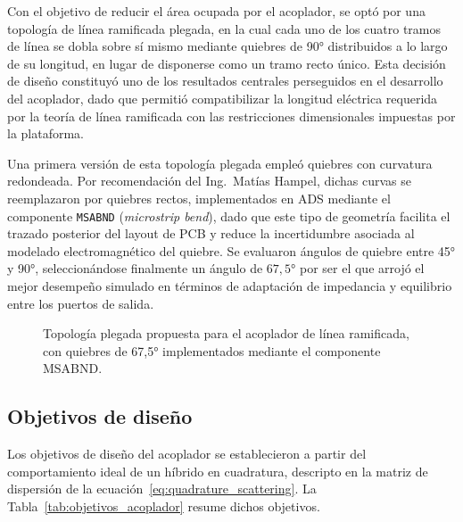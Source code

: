 Con el objetivo de reducir el área ocupada por el acoplador, se optó por una topología de línea ramificada plegada, en la cual cada uno de los cuatro tramos de línea se dobla sobre sí mismo mediante quiebres de 90° distribuidos a lo largo de su longitud, en lugar de disponerse como un tramo recto único. Esta decisión de diseño constituyó uno de los resultados centrales perseguidos en el desarrollo del acoplador, dado que permitió compatibilizar la longitud eléctrica requerida por la teoría de línea ramificada con las restricciones dimensionales impuestas por la plataforma.

Una primera versión de esta topología plegada empleó quiebres con curvatura redondeada. Por recomendación del Ing.~Matías Hampel, dichas curvas se reemplazaron por quiebres rectos, implementados en ADS mediante el componente \texttt{MSABND} (\textit{microstrip bend}), dado que este tipo de geometría facilita el trazado posterior del layout de PCB y reduce la incertidumbre asociada al modelado electromagnético del quiebre. Se evaluaron ángulos de quiebre entre 45° y 90°, seleccionándose finalmente un ángulo de $67{,}5$° por ser el que arrojó el mejor desempeño simulado en términos de adaptación de impedancia y equilibrio entre los puertos de salida.

\begin{figure}[H]
    \centering
    \caption{Topología plegada propuesta para el acoplador de línea ramificada, con quiebres de 67,5° implementados mediante el componente MSABND.}
    \label{fig:acoplador_topologia_plegada}
\end{figure}

\subsection{Objetivos de diseño}
Los objetivos de diseño del acoplador se establecieron a partir del comportamiento ideal de un híbrido en cuadratura, descripto en la matriz de dispersión de la ecuación~\eqref{eq:quadrature_scattering}. La Tabla~\ref{tab:objetivos_acoplador} resume dichos objetivos.

